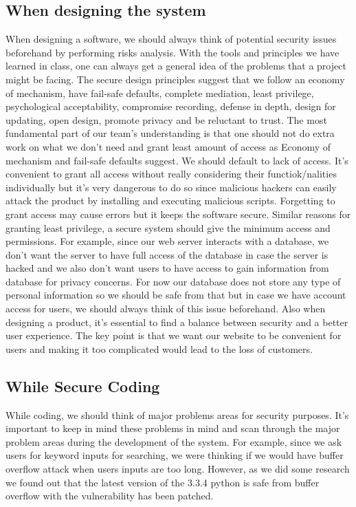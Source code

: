\documentclass[12pt, a4paper]{article}
\begin{document}
\subsection{When designing the system}
When designing a software, we should always think of potential security issues beforehand by performing risks analysis. With the tools and principles we have learned in class, one can always get a general idea of the problems that a project might be facing. The secure design principles suggest that we follow an economy of mechanism, have fail-safe defaults, complete mediation, least privilege, psychological acceptability, compromise recording, defense in depth, design for updating, open design, promote privacy and be reluctant to trust. The most fundamental part of our team's understanding is that one should not do extra work on what we don’t need and grant least amount of access as Economy of mechanism and fail-safe defaults suggest. We should default to lack of access. It’s convenient to grant all access without really considering their functiok/nalities individually but it’s very dangerous to do so since malicious hackers can easily attack the product by installing and executing malicious scripts. Forgetting to grant access may cause errors but it keeps the software secure. Similar reasons for granting least privilege, a secure system should give the minimum access and permissions. For example, since our web server interacts with a database, we don’t want the server to have full access of the database in case the server is hacked and we also don’t want users to have access to gain information from database for privacy concerns. For now our database does not store any type of personal information so we should be safe from that but in case we have account access for users, we should always think of this issue beforehand. Also when designing a product, it’s essential to find a balance between security and a better user experience. The key point is that we want our website to be convenient for users and making it too complicated would lead to the loss of customers.
\subsection{While Secure Coding}
While coding, we should think of major problems areas for security purposes. It’s important to keep in mind these problems in mind and scan through the major problem areas during the development of the system. For example, since we ask users for keyword inputs for searching, we were thinking if we would have buffer overflow attack when users inputs are too long. However, as we did some research we found out that the latest version of the 3.3.4 python is safe from buffer overflow with the vulnerability has been patched.
\end{document}

